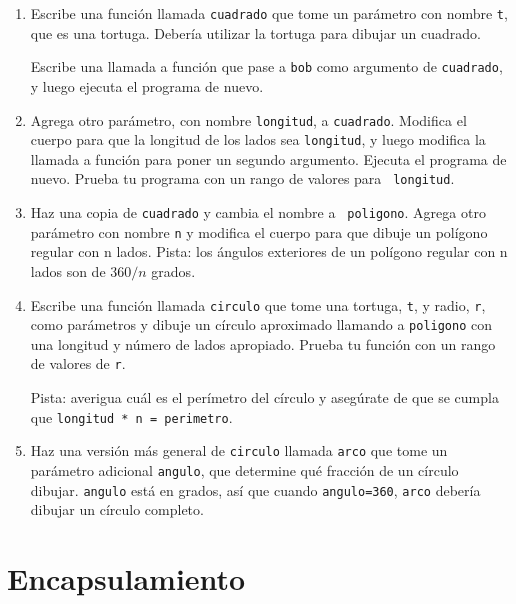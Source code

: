 \documentclass[10pt]{book}
\begin{document}
\begin{enumerate}

\item Escribe una función llamada {\tt cuadrado} que tome un parámetro
con nombre {\tt t}, que es una tortuga.  Debería utilizar la tortuga para dibujar
un cuadrado.

Escribe una llamada a función que pase a {\tt bob} como argumento de 
{\tt cuadrado}, y luego ejecuta el programa de nuevo.

\item Agrega otro parámetro, con nombre {\tt longitud}, a {\tt cuadrado}.
Modifica el cuerpo para que la longitud de los lados sea {\tt longitud}, y luego
modifica la llamada a función para poner un segundo argumento.  Ejecuta el
programa de nuevo.  Prueba tu programa con un rango de valores para {\tt
longitud}.

\item Haz una copia de {\tt cuadrado} y cambia el nombre a {\tt
  poligono}.  Agrega otro parámetro con nombre {\tt n} y modifica el cuerpo
  para que dibuje un polígono regular con n lados.  Pista: los ángulos exteriores
  de un polígono regular con n lados son de $360/n$ grados.   

\item Escribe una función llamada {\tt circulo} que tome una tortuga,
{\tt t}, y radio, {\tt r}, como parámetros y dibuje un círculo
aproximado llamando a {\tt poligono} con una longitud y
número de lados apropiado.  Prueba tu función con un rango de valores
de {\tt r}.   

Pista: averigua cuál es el perímetro del círculo y asegúrate de que
se cumpla que {\tt longitud * n = perimetro}.

\item Haz una versión más general de {\tt circulo} llamada {\tt arco}
que tome un parámetro adicional {\tt angulo}, que determine
qué fracción de un círculo dibujar.  {\tt angulo} está en
grados, así que cuando {\tt angulo=360}, {\tt arco} debería dibujar un círculo
completo.

\end{enumerate}


\section{Encapsulamiento}
\end{document}
